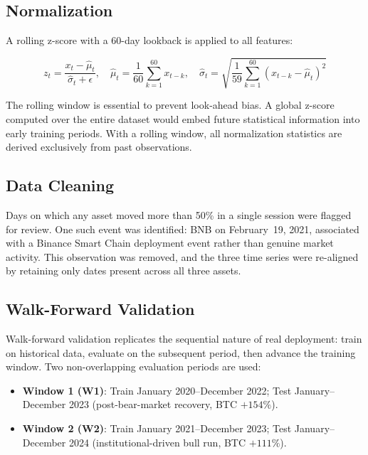 \documentclass[pdflatex,sn-mathphys-num]{sn-jnl}
\begin{document}
\subsection{Normalization}

A rolling z-score with a 60-day lookback is applied to all features:

\begin{equation}\label{eq:zscore}
    z_t = \frac{x_t - \hat{\mu}_{t}}{\hat{\sigma}_{t} + \epsilon}, \quad
    \hat{\mu}_{t} = \frac{1}{60}\sum_{k=1}^{60} x_{t-k}, \quad
    \hat{\sigma}_{t} = \sqrt{\frac{1}{59}\sum_{k=1}^{60}(x_{t-k} - \hat{\mu}_{t})^2}
\end{equation}

The rolling window is essential to prevent look-ahead bias. A global z-score
computed over the entire dataset would embed future statistical information into
early training periods. With a rolling window, all normalization statistics are
derived exclusively from past observations.

\subsection{Data Cleaning}

Days on which any asset moved more than 50\% in a single session were
flagged for review. One such event was identified: BNB on February~19, 2021,
associated with a Binance Smart Chain deployment event rather than genuine
market activity. This observation was removed, and the three time series were
re-aligned by retaining only dates present across all three assets.

\subsection{Walk-Forward Validation}\label{sec:walkforward}

Walk-forward validation replicates the sequential nature of real deployment:
train on historical data, evaluate on the subsequent period, then advance the
training window. Two non-overlapping evaluation periods are used:

\begin{itemize}[leftmargin=*]
\item \textbf{Window 1 (W1)}: Train January 2020--December 2022; Test January--December 2023 (post-bear-market recovery, BTC $+154\%$).
\item \textbf{Window 2 (W2)}: Train January 2021--December 2023; Test January--December 2024 (institutional-driven bull run, BTC $+111\%$).
\end{itemize}
\end{document}
